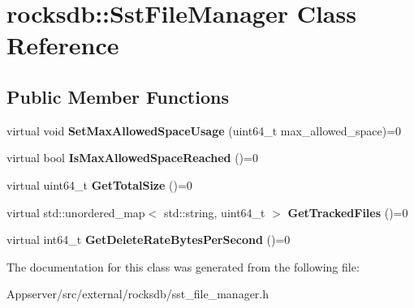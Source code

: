 \hypertarget{classrocksdb_1_1SstFileManager}{}\section{rocksdb\+:\+:Sst\+File\+Manager Class Reference}
\label{classrocksdb_1_1SstFileManager}
\subsection*{Public Member Functions}
\begin{DoxyCompactItemize}
\item 
virtual void {\bfseries Set\+Max\+Allowed\+Space\+Usage} (uint64\+\_\+t max\+\_\+allowed\+\_\+space)=0\hypertarget{classrocksdb_1_1SstFileManager_aca38f0c983498358ddddbd195bb62f84}{}\label{classrocksdb_1_1SstFileManager_aca38f0c983498358ddddbd195bb62f84}

\item 
virtual bool {\bfseries Is\+Max\+Allowed\+Space\+Reached} ()=0\hypertarget{classrocksdb_1_1SstFileManager_a76deefac85df97ee34316285162455a4}{}\label{classrocksdb_1_1SstFileManager_a76deefac85df97ee34316285162455a4}

\item 
virtual uint64\+\_\+t {\bfseries Get\+Total\+Size} ()=0\hypertarget{classrocksdb_1_1SstFileManager_ad2893147a45d00f2f815219c5ebf9db2}{}\label{classrocksdb_1_1SstFileManager_ad2893147a45d00f2f815219c5ebf9db2}

\item 
virtual std\+::unordered\+\_\+map$<$ std\+::string, uint64\+\_\+t $>$ {\bfseries Get\+Tracked\+Files} ()=0\hypertarget{classrocksdb_1_1SstFileManager_a6ad40f11bc94cd0f8256ea5a86224190}{}\label{classrocksdb_1_1SstFileManager_a6ad40f11bc94cd0f8256ea5a86224190}

\item 
virtual int64\+\_\+t {\bfseries Get\+Delete\+Rate\+Bytes\+Per\+Second} ()=0\hypertarget{classrocksdb_1_1SstFileManager_a62236dbe7ff6d84e02e237bfd61e5138}{}\label{classrocksdb_1_1SstFileManager_a62236dbe7ff6d84e02e237bfd61e5138}

\end{DoxyCompactItemize}


The documentation for this class was generated from the following file\+:\begin{DoxyCompactItemize}
\item 
Appserver/src/external/rocksdb/sst\+\_\+file\+\_\+manager.\+h\end{DoxyCompactItemize}
